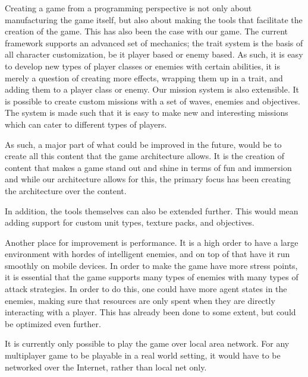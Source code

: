 Creating a game from a programming perspective is not only about manufacturing the game itself, but also about making the tools that facilitate the creation of the game.
This has also been the case with our game.
The current framework supports an advanced set of mechanics; the trait system is the basis of all character customization, be it player based or enemy based.
As such, it is easy to develop new types of player classes or enemies with certain abilities, it is merely a question of creating more effects, wrapping them up in a trait, and adding them to a player class or enemy.
Our mission system is also extensible.
It is possible to create custom missions with a set of waves, enemies and objectives.
The system is made such that it is easy to make new and interesting missions which can cater to different types of players. 

As such, a major part of what could be improved in the future, would be to create all this content that the game architecture allows.
It is the creation of content that makes a game stand out and shine in terms of fun and immersion and while our architecture allows for this, the primary focus has been creating the architecture over the content. 

In addition, the tools themselves can also be extended further.
This would mean adding support for custom unit types, texture packs, and objectives.

Another place for improvement is performance.
It is a high order to have a large environment with hordes of intelligent enemies, and on top of that have it run smoothly on mobile devices.
In order to make the game have more stress points, it is essential that the game supports many types of enemies with many types of attack strategies.
In order to do this, one could have more agent states in the enemies, making sure that resources are only spent when they are directly interacting with a player.
This has already been done to some extent, but could be optimized even further.

It is currently only possible to play the game over local area network.
For any multiplayer game to be playable in a real world setting, it would have to be networked over the Internet, rather than local net only.